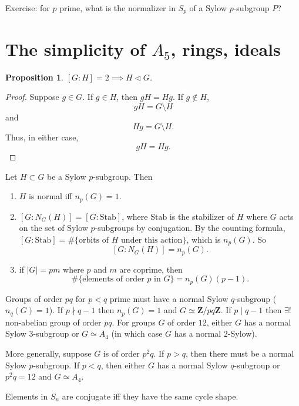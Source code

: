 \documentclass[11pt, oneside]{amsart}
\numberwithin{equation}{section}
\numberwithin{theorem}{section}
\newtheorem{proposition}[theorem]{Proposition}
\theoremstyle{definition}
\def\Z{\mathbf{Z}}
\begin{document}
{Exercise: for $p$ prime, what is the normalizer in $S_p$ of a Sylow $p$-subgroup $P$?

\section{The simplicity of $A_5$, rings, ideals} 
\begin{proposition}
$[G:H] = 2\implies H\lhd G$.
\end{proposition}
\begin{proof}
Suppose $g\in G$. If $g\in H$, then $gH = Hg$. If $g \notin H$, 
$$
gH = G \setminus H
$$
and
$$
Hg = G\setminus H.
$$
Thus, in either case,
$$
gH = Hg.
$$
\end{proof}
Let $H\subset G$ be a Sylow $p$-subgroup. Then 
\begin{enumerate}[label=(\roman*)]
\item $H$ is normal iff $n_p(G) = 1$.
\item $[G : N_G(H)] = [G : \textrm{Stab}]$, where $\textrm{Stab}$ is the stabilizer of $H$ where $G$ acts on the set of Sylow $p$-subgroups by conjugation. By the counting formula, $[G : \textrm{Stab}] = \#\{ \textrm{orbits of $H$ under this action}\}$, which is $n_p(G)$. So 
$$
[G : N_G(H)] = n_p(G).
$$
\item if $|G| = pm$ where $p$ and $m$ are coprime, then 
$$
\# \{\textrm{elements of order $p$ in $G$} \} = n_p(G)(p-1).
$$
\end{enumerate}

Groups of order $pq$ for $p < q$ prime  must have a normal Sylow $q$-subgroup ($n_q(G)=1$). If $p\nmid q-1$ then $n_p(G)=1$ and $G\simeq \Z/pq\Z$. If $p\mid q-1$ then $\exists!$ non-abelian group of order $pq$. For groups $G$ of order $12$, either $G$ has a normal Sylow $3$-subgroup or $G\simeq A_4$ (in which case $G$ has a normal $2$-Sylow).

More generally, suppose $G$ is of order $p^2q$. If $p>q$, then there must be a normal Sylow $p$-subgroup. If $p<q$, then either $G$ has a normal Sylow $q$-subgroup or $p^2q=12$ and $G\simeq A_4$. 

Elements in $S_n$ are conjugate iff they have the same cycle shape.

}
\end{document}
